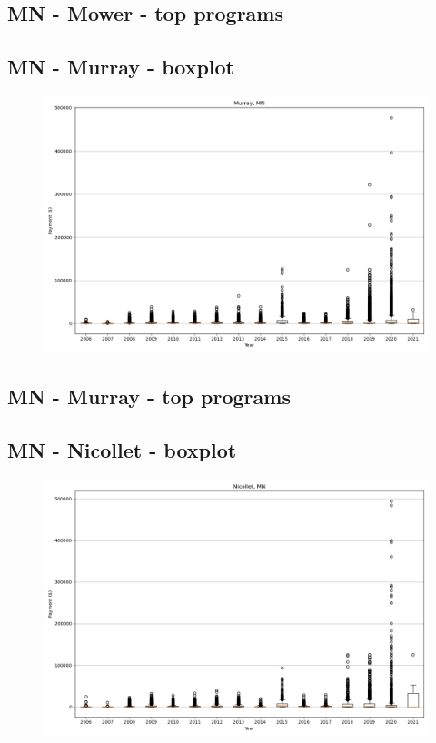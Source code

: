 \subsection*{MN - Mower - top programs}

\newpage
\subsection*{MN - Murray - boxplot}
\begin{figure}[h]
\centering
\includegraphics[width=7in]{../output/boxplots/counties/Murray-MN_boxplot.png}
\end{figure}


\subsection*{MN - Murray - top programs}

\newpage
\subsection*{MN - Nicollet - boxplot}
\begin{figure}[h]
\centering
\includegraphics[width=7in]{../output/boxplots/counties/Nicollet-MN_boxplot.png}
\end{figure}


